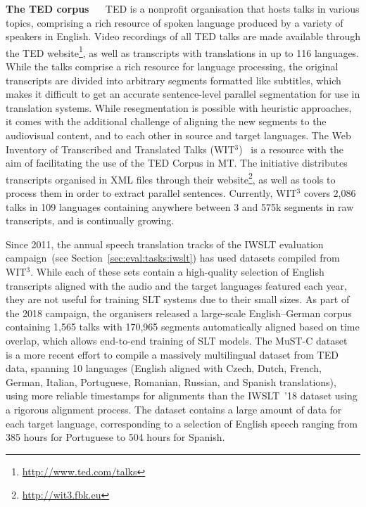 \documentclass{svjour3}
\newcommand{\element}[1]{\noindent\textbf{#1} ~~}
\newcommand{\tedtrans}{IWSLT~’18}
\begin{document}
        \element{The TED corpus}
            TED is a nonprofit organisation that hosts talks in various topics, comprising a rich resource of spoken language produced by a variety of speakers in English. Video recordings of all TED talks are made available through the TED website\footnote{\url{http://www.ted.com/talks}}, as well as transcripts with translations in up to 116 languages. While the talks comprise a rich resource for language processing, the original transcripts are divided into arbitrary segments formatted like subtitles, which makes it difficult to get an accurate sentence-level parallel segmentation for use in translation systems. While resegmentation is possible with heuristic approaches, it comes with the additional challenge of aligning the new segments to the audiovisual content, and to each other in source and target languages.
The Web Inventory of Transcribed and Translated Talks (WIT$^3$)~\citep{cettolo-wit3:-2012} is a resource with the aim of facilitating the use of the TED Corpus in MT. The initiative distributes transcripts organised in XML files through their website\footnote{\url{http://wit3.fbk.eu}}, as well as tools to process them in order to extract parallel sentences. Currently, WIT$^3$ covers 2,086 talks in 109 languages containing anywhere between 3 and 575k segments in raw transcripts, and is continually growing.
            
            Since 2011, the annual speech translation tracks of the IWSLT evaluation campaign~(see Section~\ref{sec:eval:tasks:iwslt}) has used datasets compiled from WIT$^3$. While each of these sets contain a high-quality selection of English transcripts aligned with the audio and the target languages featured each year, they are not useful for training SLT systems due to their small sizes. As part of the 2018 campaign, the organisers released a large-scale English--German corpus~\citep{niehues-iwslt-2018} containing 1,565 talks with 170,965 segments automatically aligned based on time overlap, which allows end-to-end training of SLT models. 
The MuST-C dataset~\citep{gangi-mustc-2019} is a more recent effort to compile a massively multilingual dataset from TED data, spanning 10 languages (English aligned with Czech, Dutch, French, German, Italian, Portuguese, Romanian, Russian, and Spanish translations), using more reliable timestamps for alignments than the \tedtrans{} dataset using a rigorous alignment process.
            The dataset contains a large amount of data for each target language, corresponding to a selection of English speech ranging from 385 hours for Portuguese to 504 hours for Spanish. \\
            
\end{document}
